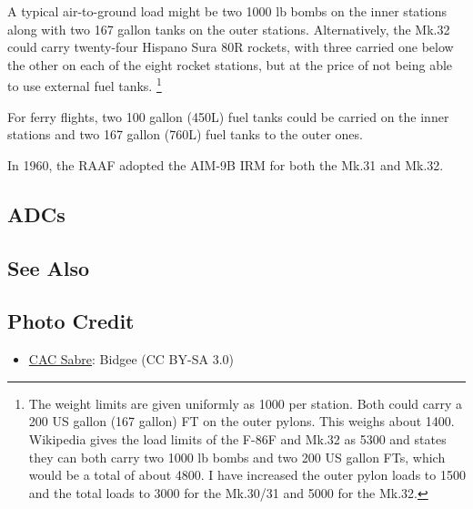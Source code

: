 A typical air-to-ground load might be two 1000 lb bombs on the inner stations along with two 167 gallon tanks on the outer stations. Alternatively, the Mk.32 could carry twenty-four Hispano Sura 80R rockets, with three carried one below the other on each of the eight rocket stations, but at the price of not being able to use external fuel tanks.%
\footnote{
    The weight limits are given uniformly as 1000 per station. Both could carry a 200 US gallon (167 gallon) FT on the outer pylons. This weighs about 1400. Wikipedia gives the load limits of the F-86F and Mk.32 as 5300 and states they can both carry two 1000 lb bombs and two 200 US gallon FTs, which would be a total of about 4800. I have increased the outer pylon loads to 1500 and the total loads to 3000 for the Mk.30/31 and 5000 for the Mk.32.
}

For ferry flights, two 100 gallon (450L) fuel tanks could be carried on the inner stations and two 167 gallon (760L) fuel tanks to the outer ones.

In 1960, the RAAF adopted the AIM-9B IRM for both the Mk.31 and Mk.32.

\subsection{ADCs}

\begin{adclist}
\end{adclist}

\subsection{See Also}

\begin{typelist}
\end{typelist}

\subsection{Photo Credit}
\begin{itemize}\raggedright
    \item \href{https://commons.wikimedia.org/wiki/File:Royal_Australian_Air_Force,_on_loan_to_the_Temora_Aviation_Museum,_(VH-IPN,_former_military_registration_A94-983)_CAC_Sabre_Mk.32_landing_at_Avalon_during_the_2015_Australian_International_Airshow.jpg}{CAC Sabre}: Bidgee (CC BY-SA 3.0)
\end{itemize}